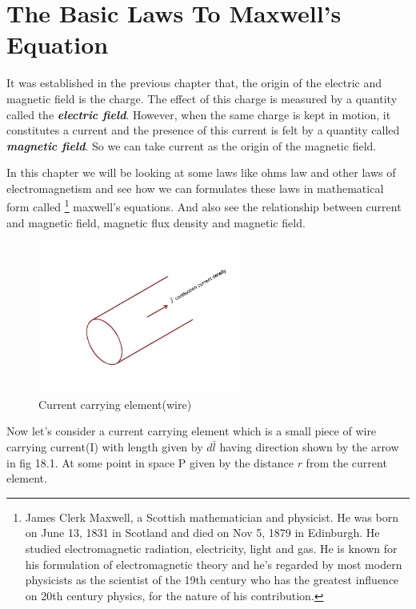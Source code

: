 \chapter{The Basic Laws To Maxwell's Equation}
It was established in the previous chapter that, the origin of the electric and magnetic field is the charge. The effect of this charge is measured by a quantity called the \textbf{\emph{electric field}}. However, when the same charge is kept in motion, it constitutes a current and the presence of this current is felt by a quantity called \textbf{\emph{magnetic field}}. So we can take current as the origin of the magnetic field. 

In this chapter we will be looking at some laws like ohms law and other laws of electromagnetism and see how we can formulates these laws in mathematical form called \footnote[1]{James Clerk Maxwell, a Scottish mathematician and physicist. He was born on June 13, 1831 in Scotland and died on Nov 5, 1879 in Edinburgh. He studied electromagnetic radiation, electricity, light and gas. He is known for his formulation of electromagnetic theory and he's regarded by most modern physicists as the scientist of the 19th century who has the greatest influence on 20th century physics, for the nature of his contribution.} maxwell's equations. And also see the relationship between current and magnetic field, magnetic flux density and magnetic field.
\begin{figure}[h]
\centering
\includegraphics[height=5cm]{./graphics/f}
\caption{Current carrying element(wire)}
\label{}
\end{figure}

Now let's consider a current carrying element which is a small piece of wire carrying current(I) with length given by $d\bar{l}$ having direction shown by the arrow in fig 18.1. At some point in space P given by the  distance $r$ from the current element.

